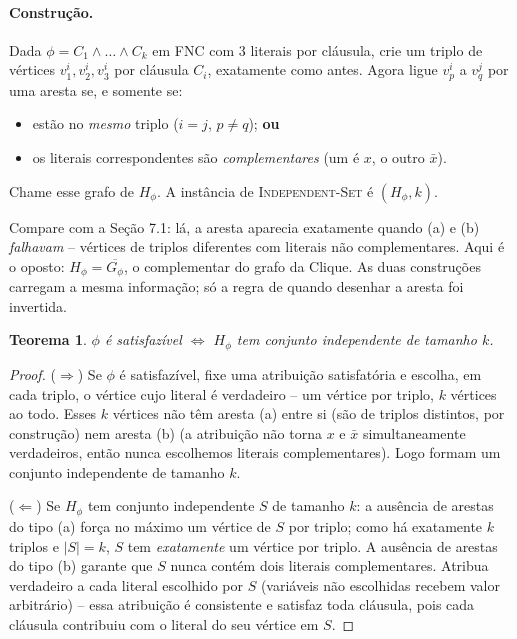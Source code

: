 \documentclass[9pt,a4paper]{extarticle}
\newcommand{\ntc}[1]{\textcolor{notice}{#1}}
\newtheorem{theorem}{Teorema}[section]
\theoremstyle{definition}
\begin{document}
\paragraph{Construção.} Dada \(\phi = C_1 \wedge \dots \wedge C_k\) em FNC com 3 literais por cláusula, crie um triplo de vértices \(v_1^i,v_2^i,v_3^i\) por cláusula \(C_i\), exatamente como antes. Agora ligue \(v_p^i\) a \(v_q^j\) por uma aresta se, e somente se:
\begin{itemize}
\item[(a)] estão no \emph{mesmo} triplo (\(i=j\), \(p \neq q\)); \textbf{ou}
\item[(b)] os literais correspondentes são \emph{complementares} (um é \(x\), o outro \(\bar x\)).
\end{itemize}
Chame esse grafo de \(H_\phi\). A instância de \textsc{Independent-Set} é \((H_\phi, k)\).

\ntc{Compare com a Seção 7.1: lá, a aresta aparecia exatamente quando (a) e (b) \emph{falhavam} -- vértices de triplos diferentes com literais não complementares. Aqui é o oposto: \(H_\phi = \overline{G_\phi}\), o complementar do grafo da Clique. As duas construções carregam a mesma informação; só a regra de quando desenhar a aresta foi invertida.}

\begin{theorem}
\(\phi\) é satisfazível \(\iff\) \(H_\phi\) tem conjunto independente de tamanho \(k\).
\end{theorem}
\begin{proof}
(\(\Rightarrow\)) Se \(\phi\) é satisfazível, fixe uma atribuição satisfatória e escolha, em cada triplo, o vértice cujo literal é verdadeiro -- um vértice por triplo, \(k\) vértices ao todo. Esses \(k\) vértices não têm aresta (a) entre si (são de triplos distintos, por construção) nem aresta (b) (a atribuição não torna \(x\) e \(\bar x\) simultaneamente verdadeiros, então nunca escolhemos literais complementares). Logo formam um conjunto independente de tamanho \(k\).

(\(\Leftarrow\)) Se \(H_\phi\) tem conjunto independente \(S\) de tamanho \(k\): a ausência de arestas do tipo (a) força no máximo um vértice de \(S\) por triplo; como há exatamente \(k\) triplos e \(|S|=k\), \(S\) tem \emph{exatamente} um vértice por triplo. A ausência de arestas do tipo (b) garante que \(S\) nunca contém dois literais complementares. Atribua verdadeiro a cada literal escolhido por \(S\) (variáveis não escolhidas recebem valor arbitrário) -- essa atribuição é consistente e satisfaz toda cláusula, pois cada cláusula contribuiu com o literal do seu vértice em \(S\).
\end{proof}
\end{document}
